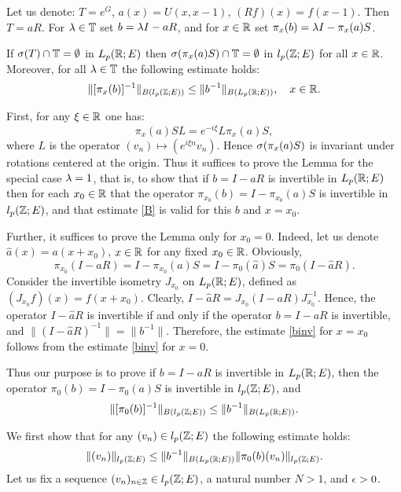 Let us denote: $T=e^G$, $a(x) =U(x,x-1)$, $(Rf) (x) =f(x-1)$.
Then $T=aR$. For $\lambda \in{\Bbb{T}}$ set $b=\lambda I -aR$, and for
$x\in{\Bbb{R}}$ set $\pi_x (b) =\lambda I-\pi_x(a)S$.

\begin{lem}
If $\sigma (T) \cap {\Bbb{T}} =\emptyset$ in $L_p({\Bbb{R}};E)$ then $\sigma (\pi_x (a) S)
\cap {\Bbb{T}} =\emptyset$ in $l_p({\Bbb{Z}};E)$
for all $x\in{\Bbb{R}}$.
Moreover, for all $\lambda \in{\Bbb{T}}$ the following estimate holds:
\begin{equation}
\| [\pi_x (b)]^{-1}\|_{B(l_p (\bbZ;E))} \leq \|b^{-1}\|_{B(L_p
(\bbR;E))},\quad x\in\bbR.
\lb{binv}
\end{equation}
\end{lem}


\begin{pf}
First, for any $\xi \in{\Bbb{R}}$ one has:
$$\pi_x (a) SL=e^{-i\xi} L\pi_x (a) S,$$
where $L$ is the operator $(v_n)\mapsto (e^{i\xi n} v_n)$.
Hence
$\sigma (\pi_x(a) S)$ is invariant under rotations centered at
the origin.  Thus it suffices to prove the Lemma for the
special case $\lambda=1$, that is,
to show that if $b=I-aR$ is invertible in $L_p ({\Bbb{R}};E)$
then for
each $x_0\in{\Bbb{R}}$ that the operator
$\pi_{x_0}(b)=I-\pi_{x_0}(a)S$ is invertible in $l_p({\Bbb{Z}};E)$, and that
estimate \eqref{B}
is valid for this $b$ and $x=x_0$.

Further, it suffices to prove the Lemma only for $x_0=0$.
Indeed, let us denote $\hat{a}(x)=a(x+x_0)$, $x\in {\Bbb{R}}$ for any fixed
$x_0\in {\Bbb{R}}$. Obviously,
$$
\pi_{x_0}(I-aR)=I-\pi_{x_0}(a)S=I-\pi_0(\hat{a})S=\pi_{0}(I-\hat{a}R).
$$
Consider the invertible isometry $J_{x_0}$ on $L_p({\Bbb{R}};E)$, defined
as  $(J_{x_0}f)(x)=f(x+x_0)$. Clearly,
$I-\hat{a}R=J_{x_0}(I-aR)J_{x_0}^{-1}$.
Hence, the operator $I-\hat{a}R$ is invertible if and only if
the operator $b=I-aR$ is invertible, and $\|(I-\hat{a}R)^{-1}\|=\|b^{-1}\|$.
Therefore, the estimate \eqref{binv} for $x=x_0$ follows
from the estimate \eqref{binv} for $x=0$.

Thus our purpose is to prove if $b=I-aR$ is invertible in $L_p({\Bbb{R}}; E)$,
then the
operator $\pi_0 (b)=I-\pi_0(a)S$
is invertible in $l_p({\Bbb{Z}}; E)$, and
\begin{equation}\label{est0}
\| [\pi_0 (b)]^{-1}\|_{B(l_p ({\Bbb{Z}};E))} \leq \|b^{-1}\|_{B(L_p
({\Bbb{R}};E))}.
\end{equation}

We first show that
for any $(v_n) \in l_p ({\Bbb{Z}};E)$ the
following estimate holds:
\begin{equation}
\| (v_n)\|_{l_p (\bbZ;E)} \leq \|b^{-1}\|_{B(L_p (\bbR;E))} \| \pi_0
(b) (v_n)\|_{l_p(\bbZ;E)}.
\lb{B}
\end{equation}
Let us fix a sequence
$(v_n)_{n\in{\Bbb{Z}}}\in l_p ({\Bbb{Z}};E)$, a natural number $N>1$, and $\epsilon > 0$.


\end{pf}
